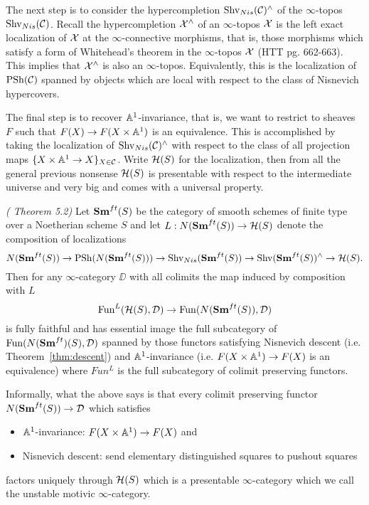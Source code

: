 \documentclass[12pt]{article}
\numberwithin{equation}{section}
\numberwithin{lemma}{section}
\numberwithin{theorem}{section}
\numberwithin{proposition}{section}
\numberwithin{corollary}{section}
\numberwithin{definition}{section}
\numberwithin{example}{section}
\numberwithin{remark}{section}
\begin{document}
The next step is to consider the hypercompletion
$\operatorname{Shv}_{Nis}(\mathcal{C})^{\wedge}$ of the $\infty$-topos
$\operatorname{Shv}_{Nis}(\mathcal{C})$. Recall the hypercompletion $\mathcal{X}^{\wedge}$ of an
$\infty$-topos $\mathcal{X}$ is the left exact localization of $\mathcal{X}$ at the
$\infty$-connective morphisms, that is, those morphisms which satisfy
a form of Whitehead's theorem in the $\infty$-topos $\mathcal{X}$ (HTT
pg. 662-663). This implies that $\mathcal{X}^{\wedge}$ is also an
$\infty$-topos. Equivalently, this is the localization of $\operatorname{PSh}(\mathcal{C})$
spanned by objects which are local with respect to the class of
Nisnevich hypercovers.

The final step is to recover $\mathbb A^1$-invariance, that is, we want to
restrict to sheaves $F$ such that $F(X) \to F(X \times \mathbb A^1)$ is an
equivalence. This is accomplished by taking the localization of
$\operatorname{Shv}_{Nis}(\mathcal{C})^{\wedge}$ with respect to the class of all projection
maps $\{X \times \mathbb A^1 \to X\}_{X \in \mathcal{C}}$. Write $\mathcal{H}(S)$ for the
localization, then from all the general previous nonsense $\mathcal{H}(S)$ is
presentable with respect to the intermediate universe and very big and
comes with a universal property.

\begin{theorem}{\emph{(\cite{robalo2012noncommutative} Theorem 5.2)}}
  Let $\mathbf{Sm}^{ft}(S)$ be the category of smooth schemes of finite type
  over a Noetherian scheme $S$ and let $L : N(\mathbf{Sm}^{ft}(S)) \to \mathcal{H}(S)$
  denote the composition of localizations
  \begin{equation*}
    N(\mathbf{Sm}^{ft}(S)) \to \operatorname{PSh}(N(\mathbf{Sm}^{ft}(S))) \to \operatorname{Shv}_{Nis}(\mathbf{Sm}^{ft}(S)) \to \operatorname{Shv}(\mathbf{Sm}^{ft}(S))^{\wedge} \to \mathcal{H}(S).
  \end{equation*}
  Then for any $\infty$-category $\DD$ with all colimits the map
  induced by composition with $L$
  \begin{equation*}
    \operatorname{Fun}^{L}(\mathcal{H}(S), \mathcal{D}) \to \operatorname{Fun}(N(\mathbf{Sm}^{ft}(S)), \mathcal{D})
  \end{equation*}
  is fully faithful and has essential image the full subcategory of
  $\operatorname{Fun}(N(\mathbf{Sm}^{ft})(S), \mathcal{D})$ spanned by those functors satisfying
  Nisnevich descent (i.e. Theorem~\ref{thm:descent}) and
  $\mathbb A^1$-invariance (i.e. $F(X \times \mathbb A^1) \to F(X)$ is an
  equivalence) where $Fun^{L}$ is the full subcategory of colimit
  preserving functors.
\end{theorem}

Informally, what the above says is that every colimit preserving
functor $N(\mathbf{Sm}^{ft}(S)) \to \mathcal{D}$ which satisfies
\begin{itemize}
\item $\mathbb A^1$-invariance: $F(X \times \mathbb A^1) \to F(X)$ and
\item Nisnevich descent: send elementary distinguished squares to
  pushout squares
\end{itemize}
factors uniquely through $\mathcal{H}(S)$ which is a presentable
$\infty$-category which we call the unstable motivic
$\infty$-category.
\end{document}
